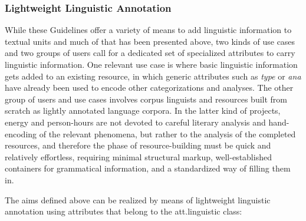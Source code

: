 \subsubsection[{Lightweight Linguistic Annotation}]{Lightweight Linguistic Annotation}\label{AILALW}\par
While these Guidelines offer a variety of means to add linguistic information to textual units and much of that has been presented above, two kinds of use cases and two groups of users call for a dedicated set of specialized attributes to carry linguistic information. One relevant use case is where basic linguistic information gets added to an existing resource, in which generic attributes such as {\itshape type} or {\itshape ana} have already been used to encode other categorizations and analyses. The other group of users and use cases involves corpus linguists and resources built from scratch as lightly annotated language corpora. In the latter kind of projects, energy and person-hours are not devoted to careful literary analysis and hand-encoding of the relevant phenomena, but rather to the analysis of the completed resources, and therefore the phase of resource-building must be quick and relatively effortless, requiring minimal structural markup, well-established containers for grammatical information, and a standardized way of filling them in.\par
The aims defined above can be realized by means of lightweight linguistic annotation using attributes that belong to the \textsf{att.linguistic} class: 
